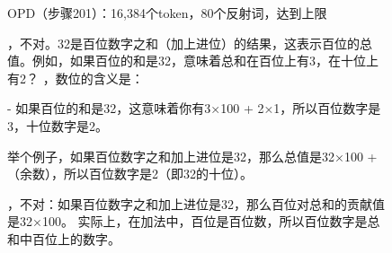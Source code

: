 \begin{figure}[h]
\begin{minipage}[t]{0.495\linewidth}
\begin{opdbox}{OPD（步骤201）：16,384个token，80个反射词，达到上限}

，不对。32是百位数字之和（加上进位）的结果，这表示百位的总值。例如，如果百位的和是32，意味着总和在百位上有3，在十位上有2？ ，数位的含义是：

- 如果百位的和是32，这意味着你有3×100 + 2×1，所以百位数字是3，十位数字是2。


举个例子，如果百位数字之和加上进位是32，那么总值是32×100 +（余数），所以百位数字是2（即32的十位）。

，不对：如果百位数字之和加上进位是32，那么百位对总和的贡献值是32×100。  实际上，在加法中，百位是百位数，所以百位数字是总和中百位上的数字。

\capped
\end{opdbox}
\end{minipage}

\label{fig:qual_t1}
\end{figure}







